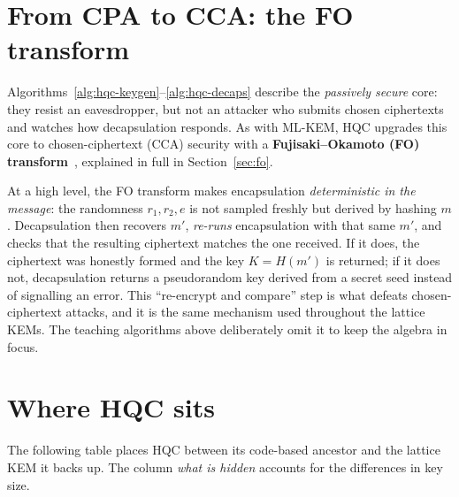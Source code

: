 \section{From CPA to CCA: the FO transform}

Algorithms~\ref{alg:hqc-keygen}--\ref{alg:hqc-decaps} describe the \emph{passively secure} core: they resist an eavesdropper, but not an attacker who submits chosen ciphertexts and watches how decapsulation responds. As with ML-KEM, HQC upgrades this core to chosen-ciphertext (CCA) security with a \textbf{Fujisaki--Okamoto (FO) transform}~\cite{fo1999},
explained in full in Section~\ref{sec:fo}.

At a high level, the FO transform makes encapsulation \emph{deterministic in the message}: the randomness $r_1, r_2, e$ is not sampled freshly but derived by hashing $m$. Decapsulation then recovers $m'$, \emph{re-runs} encapsulation with that same $m'$, and checks that the resulting ciphertext matches the one received. If it does, the ciphertext was honestly formed and the key $K = H(m')$ is returned; if it does not, decapsulation returns a pseudorandom key derived from a secret seed instead of signalling an error. This ``re-encrypt and compare'' step is what defeats chosen-ciphertext attacks, and it is the same mechanism used throughout the lattice KEMs. The teaching algorithms above deliberately omit it to keep the algebra in focus.

\section{Where HQC sits}

The following table places HQC between its code-based ancestor and the lattice KEM it backs up. The column \emph{what is hidden} accounts for the differences in key size.

